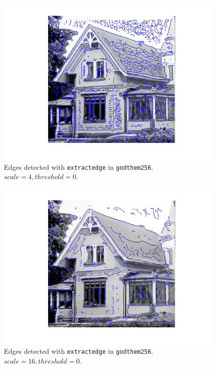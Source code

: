 \begin{figure}[H]
	\centering
	\includegraphics[scale=0.8]{./images/Q7/house/4_0.png}
	\caption{Edges detected with \texttt{extractedge} in \texttt{godthem256}. $scale = 4, threshold = 0$.}
	\label{fig:Q7_house_4_0}
\end{figure}

\begin{figure}[H]
	\centering
	\includegraphics[scale=0.8]{./images/Q7/house/16_0.png}
	\caption{Edges detected with \texttt{extractedge} in \texttt{godthem256}. $scale = 16, threshold = 0$.}
	\label{fig:Q7_house_16_0}
\end{figure}

